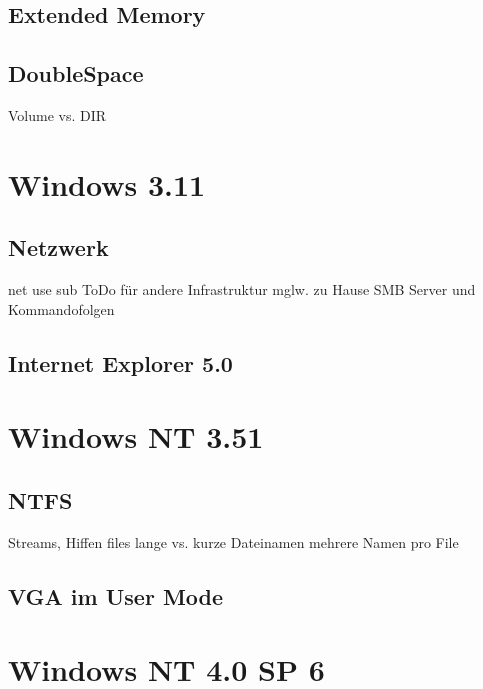 	\subsection{Extended Memory}
	\subsection{DoubleSpace}

	Volume vs. DIR

\section{Windows 3.11}

	\subsection{Netzwerk}

	net use sub 
	ToDo für andere Infrastruktur mglw. zu Hause SMB Server und Kommandofolgen

	\subsection{Internet Explorer 5.0}

\section{Windows NT 3.51}

	\subsection{NTFS}
	Streams, Hiffen files
	lange vs. kurze Dateinamen
	mehrere Namen pro File

	\subsection{VGA im User Mode}

\section{Windows NT 4.0 SP 6}


